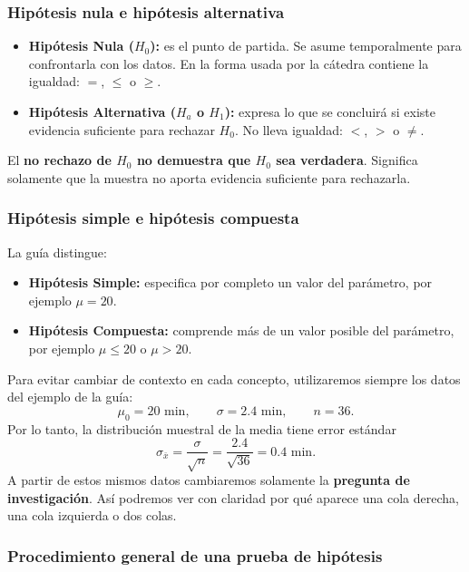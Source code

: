\documentclass[11pt,a4paper]{article}
\begin{document}
\subsubsection{Hipótesis nula e hipótesis alternativa}

\begin{itemize}
\item \textbf{Hipótesis Nula ($H_0$):} es el punto de partida. Se asume temporalmente para confrontarla con los datos. En la forma usada por la cátedra contiene la igualdad: $=$, $\le$ o $\ge$.
\item \textbf{Hipótesis Alternativa ($H_a$ o $H_1$):} expresa lo que se concluirá si existe evidencia suficiente para rechazar $H_0$. No lleva igualdad: $<$, $>$ o $\neq$.
\end{itemize}

\begin{regla}
El \textbf{no rechazo de $H_0$ no demuestra que $H_0$ sea verdadera}. Significa solamente que la muestra no aporta evidencia suficiente para rechazarla.
\end{regla}

\subsubsection{Hipótesis simple e hipótesis compuesta}

La guía distingue:
\begin{itemize}
\item \textbf{Hipótesis Simple:} especifica por completo un valor del parámetro, por ejemplo $\mu=20$.
\item \textbf{Hipótesis Compuesta:} comprende más de un valor posible del parámetro, por ejemplo $\mu\le20$ o $\mu>20$.
\end{itemize}

\begin{casotroncal}
Para evitar cambiar de contexto en cada concepto, utilizaremos siempre los datos del ejemplo de la guía:
\[
\mu_0=20\text{ min},\qquad \sigma=2.4\text{ min},\qquad n=36.
\]
Por lo tanto, la distribución muestral de la media tiene error estándar
\[
\sigma_{\bar{x}}=\frac{\sigma}{\sqrt n}=\frac{2.4}{\sqrt{36}}=0.4\text{ min}.
\]
A partir de estos mismos datos cambiaremos solamente la \textbf{pregunta de investigación}. Así podremos ver con claridad por qué aparece una cola derecha, una cola izquierda o dos colas.
\end{casotroncal}

\subsubsection{Procedimiento general de una prueba de hipótesis}
\end{document}
